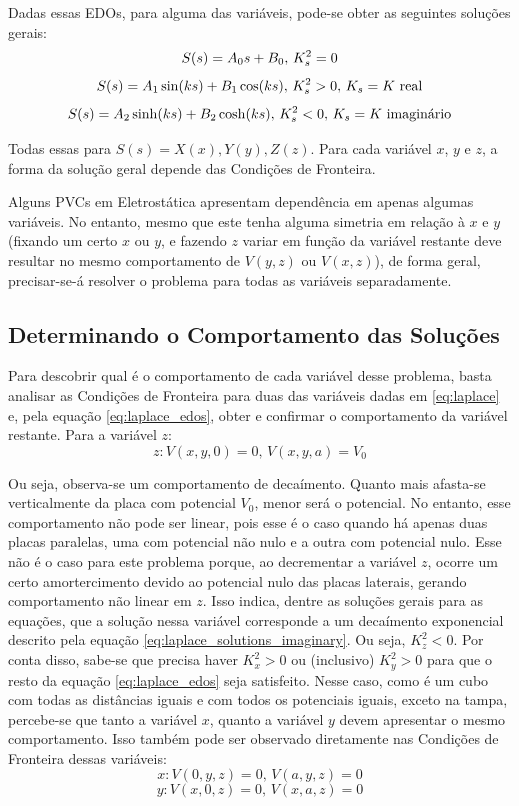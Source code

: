 \documentclass{report}
\begin{document}
Dadas essas EDOs, para alguma das variáveis, pode-se obter as seguintes soluções gerais:
\begin{equation}
    \label{eq:laplace_solutions_degenerates}
    \centering
    S(s) = A_0s + B_0,\, K_s^2 = 0
\end{equation}
\begin{equation}
    \label{eq:laplace_solutions_real}
    \centering
    S(s) = A_1\sin(ks) + B_1\cos(ks),\, K_s^2 > 0,\, K_s = K \text{ real}
\end{equation}
\begin{equation}
    \label{eq:laplace_solutions_imaginary}
    \centering
    S(s) = A_2\sinh(ks) + B_2\cosh(ks),\, K_s^2 < 0,\, K_s = K \text{ imaginário}
\end{equation}

Todas essas para $ S(s) = X(x), Y(y), Z(z) $. Para cada variável $ x $, $ y $ e $ z $, a
forma da solução geral depende das Condições de Fronteira.

Alguns PVCs em Eletrostática apresentam dependência em apenas algumas variáveis. No entanto,
mesmo que este tenha alguma simetria em relação à $ x $ e $ y $ (fixando um certo $ x $ ou $ y $,
e fazendo $ z $ variar em função da variável restante deve resultar no mesmo comportamento de $ V(y,z) $
ou $ V(x,z) $), de forma geral, precisar-se-á resolver o problema para todas as variáveis separadamente.

\subsection{Determinando o Comportamento das Soluções}

Para descobrir qual é o comportamento de cada variável desse problema, basta analisar as Condições de Fronteira
para duas das variáveis dadas em \ref{eq:laplace} e, pela equação \ref{eq:laplace_edos}, obter e confirmar o
comportamento da variável restante.
Para a variável $ z $:
$$ z: V(x, y, 0) = 0,\, V(x, y, a) = V_0 $$

Ou seja, observa-se um comportamento de decaímento. Quanto mais afasta-se verticalmente da placa com potencial $ V_0 $,
menor será o potencial. No entanto, esse comportamento não pode ser linear, pois esse é o caso quando há apenas duas placas
paralelas, uma com potencial não nulo e a outra com potencial nulo. Esse não é o caso para este problema porque, ao decrementar
a variável $ z $, ocorre um certo amortercimento devido ao potencial nulo das placas laterais, gerando comportamento não linear
em $ z $. Isso indica, dentre as soluções gerais para as equações, que a solução nessa variável corresponde
a um decaímento exponencial descrito pela equação \ref{eq:laplace_solutions_imaginary}. Ou seja, $ K_z^2 < 0 $. Por conta
disso, sabe-se que precisa haver $ K_x^2 > 0 $ ou (inclusivo) $ K_y^2 > 0 $ para que o resto da equação \ref{eq:laplace_edos} seja satisfeito.
Nesse caso, como é um cubo com todas as distâncias iguais e com todos os potenciais iguais, exceto na tampa, percebe-se que tanto
a variável $ x $, quanto a variável $ y $ devem apresentar o mesmo comportamento. Isso também pode ser observado diretamente nas
Condições de Fronteira dessas variáveis:
$$ x: V(0, y, z) = 0,\, V(a, y, z) = 0 $$
$$ y: V(x, 0, z) = 0,\, V(x, a, z) = 0 $$
\end{document}
